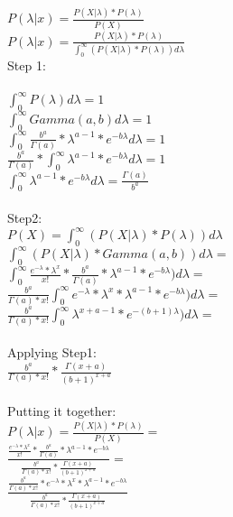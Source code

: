 $ P(\lambda | x) = \frac{P(X|\lambda) * P(\lambda)}{P(X)}$ \\
$ P(\lambda | x) = \frac{P(X|\lambda) * P(\lambda)}{\int_{0}^{\infty}(P(X|\lambda) * P(\lambda))d{\lambda}}$ \\

Step 1: \\
\\
$\int_{0}^{\infty} P(\lambda) d{\lambda} = 1$\\
$\int_{0}^{\infty} Gamma(a,b) d{\lambda} = 1$\\
$\int_{0}^{\infty} \frac{b^a}{\Gamma(a)} * \lambda^{a-1} * e^{-b\lambda} d{\lambda} = 1$\\ 
$\frac{b^a}{\Gamma(a)} * \int_{0}^{\infty} \lambda^{a-1} * e^{-b\lambda} d{\lambda} = 1$\\
$\int_{0}^{\infty} \lambda^{a-1} * e^{-b\lambda} d{\lambda} = \frac{\Gamma(a)}{b^a}$\\
\\
Step2: \\

$P(X) = \int_{0}^{\infty}(P(X|\lambda) * P(\lambda))d{\lambda} $ \\
$\int_{0}^{\infty}(P(X|\lambda) * Gamma(a,b) )d{\lambda} =$ \\
$\int_{0}^{\infty}\frac{e^{-\lambda} * \lambda^x}{x!} * \frac{b^a}{\Gamma(a)} * \lambda^{a-1} * e^{-b\lambda} )d{\lambda} =$ \\
$\frac{b^a}{\Gamma(a)*x!} \int_{0}^{\infty}e^{-\lambda} * \lambda^x * \lambda^{a-1} * e^{-b\lambda} )d{\lambda} =$\\

$\frac{b^a}{\Gamma(a)*x!} \int_{0}^{\infty} \lambda^{x+a-1} * e^{-(b+1)\lambda} )d{\lambda} =$\\
\\
Applying Step1:\\
$\frac{b^a}{\Gamma(a)*x!} * \frac{\Gamma(x+a)}{(b+1)^{x+a}}$\\
\\
Putting it together:\\
$ P(\lambda | x) = \frac{P(X|\lambda) * P(\lambda)}{P(X)}=$ \\
$\frac{\frac{e^{-\lambda} * \lambda^x}{x!} * \frac{b^a}{\Gamma(a)} * \lambda^{a-1} * e^{-b\lambda} }{\frac{b^a}{\Gamma(a)*x!} * \frac{\Gamma(x+a)}{(b+1)^{x+a}}} =$ \\

$\frac{\frac{b^a}{\Gamma(a)*x!} * {e^{-\lambda} * \lambda^x} * \lambda^{a-1} * e^{-b\lambda} }{\frac{b^a}{\Gamma(a)*x!} * \frac{\Gamma(x+a)}{(b+1)^{x+a}}} $ \\

